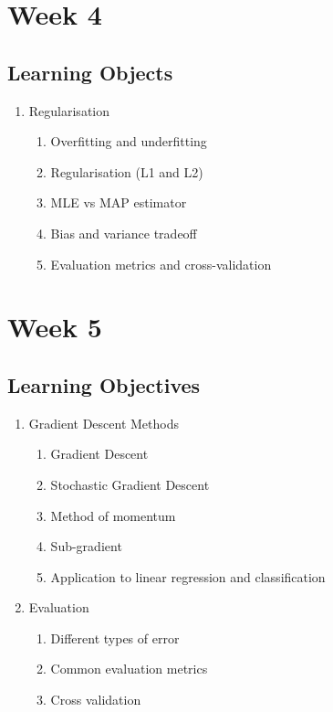 \documentclass[11pt]{scrartcl}
\theoremstyle{definition}
\theoremstyle{remark}
\begin{document}
\section{Week 4}

\subsection{Learning Objects}
\begin{enumerate}
	\item Regularisation 
	\begin{enumerate}[noitemsep]
		\item Overfitting and underfitting
		\item Regularisation (L1 and L2) 
		\item MLE vs MAP estimator 
		\item Bias and variance tradeoff 
		\item Evaluation metrics and cross-validation
	\end{enumerate}
\end{enumerate}

\section{Week 5}
\subsection{Learning Objectives}
\begin{enumerate}[noitemsep]
	\item Gradient Descent Methods 
	\begin{enumerate}[noitemsep]
		\item Gradient Descent 
		\item Stochastic Gradient Descent 
		\item Method of momentum 
		\item Sub-gradient 
		\item Application to linear regression and classification 
	\end{enumerate}
	\item Evaluation
	\begin{enumerate}[noitemsep]
		\item Different types of error 
		\item Common evaluation metrics
		\item Cross validation
	\end{enumerate}
\end{enumerate}
\end{document}
